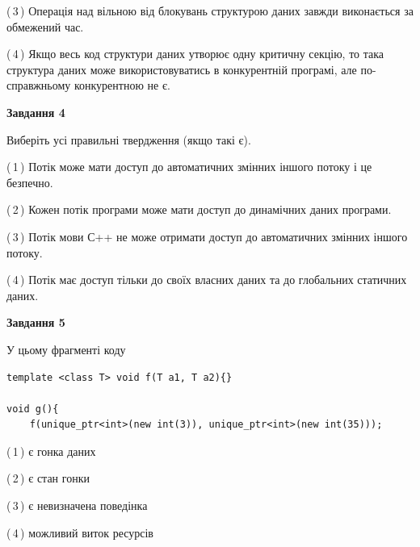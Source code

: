 \documentclass[12pt, ukrainian]{article}
\begin{document}
\begin {large}
{(\,3\,) Операція над вільною від блокувань структурою даних завжди виконається за обмежений час.%

(\,4\,) Якщо весь код структури даних утворює одну критичну секцію, то така структура даних може використовуватись в конкурентній програмі, але по-справжньо\-му конкурентною не є.%



\begin{center}
\textbf{Завдання 4}
\end{center}
Виберіть усі правильні твердження (якщо такі є).\par
\vspace{2mm}

(\,1\,) Потік може мати доступ до автоматичних змінних іншого потоку і це безпечно.%

(\,2\,) Кожен потік програми може мати доступ до динамічних даних програми.%

(\,3\,) Потік мови С++ не може отримати доступ до автоматичних змінних іншого потоку.%

(\,4\,) Потік має доступ тільки до своїх власних даних та до глобальних статичних даних.%



\begin{center}
\textbf{Завдання 5}
\end{center}
У цьому фрагменті коду
\begin{verbatim}
template <class T> void f(T a1, T a2){}

void g(){
    f(unique_ptr<int>(new int(3)), unique_ptr<int>(new int(35)));
\end{verbatim}

(\,1\,) є гонка даних%

(\,2\,) є стан гонки%

(\,3\,) є невизначена поведінка%

(\,4\,) можливий виток ресурсів%


}
\end {large}
\end{document}
